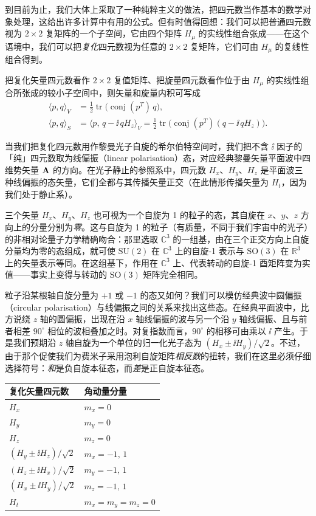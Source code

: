 到目前为止，我们大体上采取了一种纯粹主义的做法，把四元数当作基本的数学对象处理，这给出许多计算中有用的公式。但有时值得回想：我们可以把普通四元数视为 $2\times2$ 复矩阵的一个子空间，它由四个矩阵 $H_\mu$ 的实线性组合张成——在这个语境中，我们可以把\emph{复化}四元数视为任意的 $2\times2$ 复矩阵，它们可由 $H_\mu$ 的复线性组合得到。

把复化矢量四元数看作 $2\times2$ 复值矩阵、把旋量四元数看作位于由 $H_\mu$ 的实线性组合所张成的较小子空间中，则矢量和旋量内积可写成
\begin{align*}
\langle p,q\rangle_V &= \tfrac12\operatorname{tr}\bigl(\operatorname{conj}(p^{T})\,q\bigr),\\
\langle p,q\rangle_S &= \bigl\langle p,\,q-\ii\,qH_z\bigr\rangle_V
= \tfrac12\operatorname{tr}\bigl(\operatorname{conj}(p^{T})(q-\ii\,qH_z)\bigr).
\end{align*}

当我们把复化四元数用作黎曼光子自旋的希尔伯特空间时，我们把不含 $\ii$ 因子的「纯」四元数取为线偏振（linear polarisation）态，对应经典黎曼矢量平面波中四维势矢量 $\mathbf{A}$ 的方向。在光子静止的参照系中，四元数 $H_x$、$H_y$、$H_z$ 是平面波三种线偏振的态矢量，它们全都与其传播矢量正交（在此情形传播矢量为 $H_t$，因为我们处于静止系）。

三个矢量 $H_x$、$H_y$、$H_z$ 也可视为一个自旋为 1 的粒子的态，其自旋在 $x$、$y$、$z$ 方向上的分量分别为\emph{零}。这与自旋为 1 的粒子（有质量，不同于我们宇宙中的光子）的非相对论量子力学精确吻合：那里选取 $\mathbb{C}^{3}$ 的一组基，由在三个正交方向上自旋分量均为零的态组成，就可使 $\mathrm{SU}(2)$ 在 $\mathbb{C}^{3}$ 上的自旋-1 表示与 $\mathrm{SO}(3)$ 在 $\mathbb{R}^{3}$ 上的矢量表示等同。在这组基下，作用在 $\mathbb{C}^{3}$ 上、代表转动的自旋-1 酉矩阵变为实值——事实上变得与转动的 $\mathrm{SO}(3)$ 矩阵完全相同。

粒子沿某根轴自旋分量为 $+1$ 或 $-1$ 的态又如何？我们可以模仿经典波中圆偏振（circular polarisation）与线偏振之间的关系来找出这些态。在经典平面波中，比方说绕 $z$ 轴的圆偏振，出现在沿 $x$ 轴线偏振的波与另一个沿 $y$ 轴线偏振、且与前者相差 $90^\circ$ 相位的波相叠加之时。对复指数而言，$90^\circ$ 的相移可由乘以 $\ii$ 产生。于是我们预期沿 $z$ 轴自旋为一个单位的归一化光子态为 $(H_x\pm\ii H_y)/\sqrt2$。不过，由于那个促使我们为费米子采用泡利自旋矩阵\emph{相反数}的扭转，我们在这里必须仔细选择符号：\emph{和}是负自旋本征态，而\emph{差}是正自旋本征态。

\begin{center}
\begin{tabular}{ll}
\toprule
复化矢量四元数 & 角动量分量 \\
\midrule
$H_x$ & $m_x=0$ \\
$H_y$ & $m_y=0$ \\
$H_z$ & $m_z=0$ \\
$(H_y\pm\ii H_z)/\sqrt2$ & $m_x=-1,\,1$ \\
$(H_z\pm\ii H_x)/\sqrt2$ & $m_y=-1,\,1$ \\
$(H_x\pm\ii H_y)/\sqrt2$ & $m_z=-1,\,1$ \\
$H_t$ & $m_x=m_y=m_z=0$ \\
\bottomrule
\end{tabular}
\end{center}


